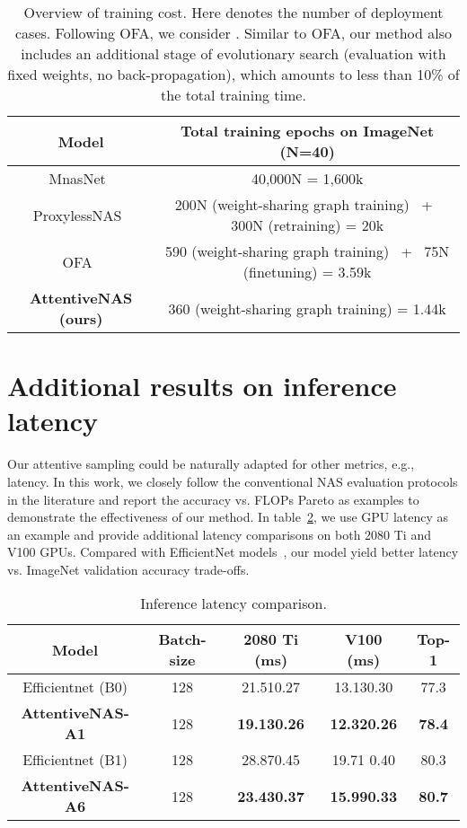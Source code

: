 \documentclass[final]{cvpr}
\theoremstyle{definition}
\begin{document}
\begin{table}[h]
    \centering
    \begin{tabular}{c|c}
    \hline
    Model   & Total training epochs on ImageNet (N=40) \\ \hline 
    MnasNet~\cite{tan2019mnasnet} & 40,000N  = 1,600k \\  
    ProxylessNAS~\cite{cai2018proxylessnas} & 200N (weight-sharing graph training) ~+~ 300N  (retraining) = 20k\\  
    OFA~\citep{cai2019once} & 590 (weight-sharing graph training) ~+~ 75N (finetuning)  = 3.59k \\  
    \bf AttentiveNAS (ours) & 360  (weight-sharing graph training) = 1.44k  \\ \hline 
    \end{tabular}
    \caption{Overview of training cost. Here  denotes the number of  deployment cases. Following OFA, we consider . Similar to OFA, 
our method also includes an additional stage of evolutionary search 
(evaluation with fixed weights, no back-propagation), 
which amounts to  less than 10\% of the total training time.}
    \label{tab:cost} 
\end{table}


\section{Additional results on inference latency}
\label{app:inference_latency}
Our attentive sampling could be naturally adapted for other metrics, e.g., latency. 
In this work, we closely follow the conventional NAS evaluation protocols in the literature and report the accuracy vs. FLOPs Pareto as examples to demonstrate the effectiveness of our method. 
In table~\ref{tab:latency}, we use GPU latency as an example and provide additional latency comparisons on both 2080 Ti and V100 GPUs. 
Compared with EfficientNet models~\citep{tan2019efficientnet}, our model yield better latency vs. ImageNet 
validation accuracy trade-offs. 
\begin{table}[ht]
    \centering
    \begin{tabular}{c|c|ccc}
    \hline 
    Model & Batch-size &  2080 Ti (ms) & V100 (ms)  &  Top-1 \\ \hline 
    Efficientnet (B0) & 128 & 21.51{\scriptsize  0.27} &  13.13{\scriptsize  0.30} & 77.3 \\
    \bf AttentiveNAS-A1 & 128 & \bf{19.13{\scriptsize  0.26}} & \bf 12.32{\scriptsize  0.26} & \bf 78.4 \\  \hline 
    Efficientnet (B1) & 128 & 28.87{\scriptsize  0.45} & 19.71 {\scriptsize  0.40}  & 80.3 \\
    \bf AttentiveNAS-A6 & 128 & \bf{23.43{\scriptsize  0.37}}  & \bf 15.99{\scriptsize  0.33}   & \bf 80.7 \\  \hline 
    \end{tabular}
    \caption{Inference latency comparison.}
    \label{tab:latency}
\end{table}
\end{document}
